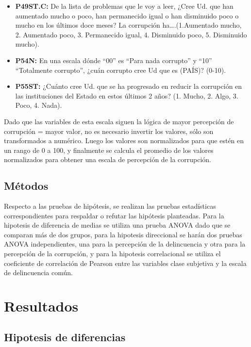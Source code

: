 \documentclass[
  spanish,
  a4paper,
  oneside]{scrbook}
\providecommand{\tightlist}{%
  \setlength{\itemsep}{0pt}\setlength{\parskip}{0pt}}
\begin{document}
\begin{itemize}
\tightlist
\item
  \textbf{P49ST.C:} De la lista de problemas que le voy a leer, ¿Cree
  Ud. que han aumentado mucho o poco, han permanecido igual o han
  disminuido poco o mucho en los últimos doce meses? La corrupción
  ha\ldots.(1.Aumentado mucho, 2. Aumentado poco, 3. Permanecido igual,
  4. Disminuido poco, 5. Disminuido mucho).
\item
  \textbf{P54N:} En una escala dónde ``00'' es ``Para nada corrupto'' y
  ``10'' ``Totalmente corrupto'', ¿cuán corrupto cree Ud que es (PAÍS)?
  (0-10).
\item
  \textbf{P55ST:} ¿Cuánto cree Ud. que se ha progresado en reducir la
  corrupción en las instituciones del Estado en estos últimos 2 años?
  (1. Mucho, 2. Algo, 3. Poco, 4. Nada).
\end{itemize}

Dado que las variables de esta escala siguen la lógica de mayor
percepción de corrupción = mayor valor, no es necesario invertir los
valores, sólo son transformados a numérico. Luego los valores son
normalizados para que estén en un rango de 0 a 100, y finalmente se
calcula el promedio de los valores normalizados para obtener una escala
de percepción de la corrupción.

\section{Métodos}\label{muxe9todos-1}

Respecto a las pruebas de hipótesis, se realizan las pruebas
estadísticas correspondientes para respaldar o refutar las hipótesis
planteadas. Para la hipotesis de diferencia de medias se utiliza una
prueba ANOVA dado que se comparan más de dos grupos, para la hipotesis
direccional se harán dos pruebas ANOVA independientes, una para la
percepción de la delincuencia y otra para la percepción de la
corrupción, y para la hipotesis correlacional se utiliza el coeficiente
de correlación de Pearson entre las variables clase subjetiva y la
escala de delincuencia común.


\chapter{Resultados}\label{resultados}

\section{Hipotesis de diferencias}\label{hipotesis-de-diferencias-1}
\end{document}
